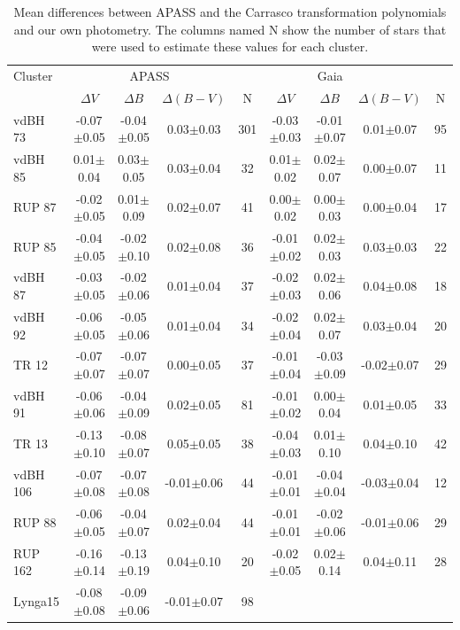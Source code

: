 \documentclass[draft]{aa}
\begin{document}
\begin{table}[ht]
    \centering
\caption{Mean differences between APASS and the Carrasco transformation
polynomials and our own photometry. The columns named N show the
number of stars that were used to estimate these values for each cluster.}
    \begin{tabular}{lcccc|cccc}
    \hline \hline 
Cluster & \multicolumn{3}{c}{APASS} & \multicolumn{4}{c}{Gaia}\\
 & $\Delta V$ & $\Delta B$ & $\Delta (B-V)$ & N & $\Delta V$ &
$\Delta B$ & $\Delta (B-V)$ & N\\
    \hline
vdBH 73   & -0.07$\pm$0.05 & -0.04$\pm$0.05 & 0.03$\pm$0.03 & 301 &
-0.03$\pm$0.03 & -0.01$\pm$0.07 & 0.01$\pm$0.07 & 95\\
vdBH 85   & 0.01$\pm$0.04 & 0.03$\pm$0.05 & 0.03$\pm$0.04 & 32 &
0.01$\pm$0.02 & 0.02$\pm$0.07 & 0.00$\pm$0.07 & 11\\
RUP 87    & -0.02$\pm$0.05 & 0.01$\pm$0.09 & 0.02$\pm$0.07 & 41 &
0.00$\pm$0.02 & 0.00$\pm$0.03 & 0.00$\pm$0.04 & 17\\
RUP 85    & -0.04$\pm$0.05 & -0.02$\pm$0.10 & 0.02$\pm$0.08 & 36 &
-0.01$\pm$0.02 & 0.02$\pm$0.03 & 0.03$\pm$0.03 & 22\\
vdBH 87   & -0.03$\pm$0.05 & -0.02$\pm$0.06 & 0.01$\pm$0.04 & 37 &
-0.02$\pm$0.03 & 0.02$\pm$0.06 & 0.04$\pm$0.08 & 18\\
vdBH 92   & -0.06$\pm$0.05 & -0.05$\pm$0.06 & 0.01$\pm$0.04 & 34 &
-0.02$\pm$0.04 & 0.02$\pm$0.07 & 0.03$\pm$0.04 & 20\\
TR 12     & -0.07$\pm$0.07 & -0.07$\pm$0.07 & 0.00$\pm$0.05 & 37 &
-0.01$\pm$0.04 & -0.03$\pm$0.09 & -0.02$\pm$0.07 & 29\\
vdBH 91   & -0.06$\pm$0.06 & -0.04$\pm$0.09 & 0.02$\pm$0.05 & 81 &
-0.01$\pm$0.02 & 0.00$\pm$0.04 & 0.01$\pm$0.05 & 33\\
TR 13     & -0.13$\pm$0.10 & -0.08$\pm$0.07 & 0.05$\pm$0.05 & 38 &
-0.04$\pm$0.03 & 0.01$\pm$0.10 & 0.04$\pm$0.10 & 42\\
vdBH 106  & -0.07$\pm$0.08 & -0.07$\pm$0.08 & -0.01$\pm$0.06 & 44 &
-0.01$\pm$0.01 & -0.04$\pm$0.04 & -0.03$\pm$0.04 & 12\\
RUP 88    & -0.06$\pm$0.05 & -0.04$\pm$0.07 & 0.02$\pm$0.04 & 44 &
-0.01$\pm$0.01 & -0.02$\pm$0.06 & -0.01$\pm$0.06 & 29\\
RUP 162   & -0.16$\pm$0.14 & -0.13$\pm$0.19 & 0.04$\pm$0.10 & 20 &
-0.02$\pm$0.05 & 0.02$\pm$0.14 & 0.04$\pm$0.11 & 28\\
Lynga15   & -0.08$\pm$0.08 & -0.09$\pm$0.06 & -0.01$\pm$0.07 & 98 &

\end{tabular}
\end{table}
\end{document}
